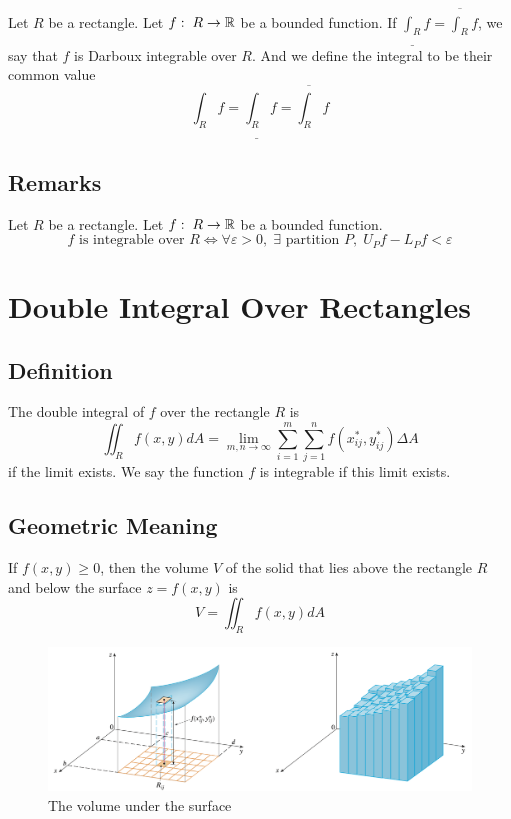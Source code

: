 \begin{definition}[Integral]
Let $R$ be a rectangle. Let $f:\; R \to {\mathbb R}$ be a bounded function. If $\underline{\int_R}f = \overline{\int_R}f$, we say that $f$ is Darboux integrable over $R$. And we define the integral to be their common value
$$
\int_R f = \underline{\int_R}f = \overline{\int_R}f
$$
\end{definition}


\subsection{Remarks}

\begin{theorem}
Let $R$ be a rectangle. Let $f:\; R \to {\mathbb R}$ be a bounded function.
$$
\text{$f$ is integrable over $R$} \iff \forall \varepsilon > 0,\; \exists \text{ partition $P$},\; U_P f - L_P f < \varepsilon
$$
\end{theorem}


\section{Double Integral Over Rectangles}

\subsection{Definition}

\begin{definition}
The double integral of $f$ over the rectangle $R$ is
$$
\iint_R f(x,y) dA = \lim_{m,n \to \infty} \sum_{i=1}^m \sum_{j=1}^n f(x_{ij}^*, y_{ij}^*) \Delta A
$$
if the limit exists. We say the function $f$ is integrable if this limit exists.
\end{definition}

\subsection{Geometric Meaning}
If $f(x,y) \geq 0$, then the volume $V$ of the solid that lies above the rectangle $R$ and below the surface $z=f(x,y)$ is
$$
V = \iint_R f(x,y) dA
$$

\begin{figure}[h]
    \centering
    \includegraphics[width=0.6\linewidth]{figures/double-Riemann.png}
    \caption{The volume under the surface}
    \label{fig:geometric_doubleInt}
\end{figure}

